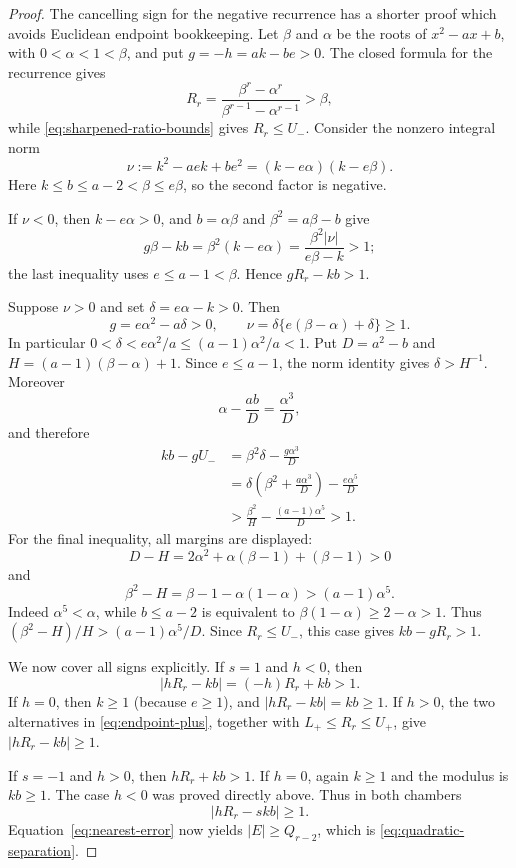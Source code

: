 \begin{proof}
The cancelling sign for the negative recurrence has a shorter proof which
avoids Euclidean endpoint bookkeeping.  Let $\beta$ and $\alpha$ be the
roots of $x^2-ax+b$, with $0<\alpha<1<\beta$, and put
$g=-h=ak-be>0$.  The closed formula for the recurrence gives
\[
R_r=\frac{\beta^r-\alpha^r}{\beta^{r-1}-\alpha^{r-1}}>\beta,
\]
while \eqref{eq:sharpened-ratio-bounds} gives $R_r\le U_-$.  Consider the
nonzero integral norm
\[
\nu:=k^2-aek+be^2=(k-e\alpha)(k-e\beta).
\]
Here $k\le b\le a-2<\beta\le e\beta$, so the second factor is negative.

If $\nu<0$, then $k-e\alpha>0$, and $b=\alpha\beta$ and
$\beta^2=a\beta-b$ give
\[
g\beta-kb=\beta^2(k-e\alpha)
=\frac{\beta^2|\nu|}{e\beta-k}>1;
\]
the last inequality uses $e\le a-1<\beta$.  Hence $gR_r-kb>1$.

Suppose $\nu>0$ and set $\delta=e\alpha-k>0$.  Then
\[
g=e\alpha^2-a\delta>0,
\qquad
\nu=\delta\{e(\beta-\alpha)+\delta\}\ge1.
\]
In particular
$0<\delta<e\alpha^2/a\le(a-1)\alpha^2/a<1$.  Put $D=a^2-b$ and
$H=(a-1)(\beta-\alpha)+1$.  Since $e\le a-1$, the norm identity gives
$\delta>H^{-1}$.  Moreover
\[
\alpha-\frac{ab}{D}=\frac{\alpha^3}{D},
\]
and therefore
\begin{align*}
kb-gU_-
&=\beta^2\delta-\frac{g\alpha^3}{D}\\
&=\delta\left(\beta^2+\frac{a\alpha^3}{D}\right)
  -\frac{e\alpha^5}{D}\\
&>\frac{\beta^2}{H}-\frac{(a-1)\alpha^5}{D}>1.
\end{align*}
For the final inequality, all margins are displayed:
\[
D-H=2\alpha^2+\alpha(\beta-1)+(\beta-1)>0
\]
and
\[
\beta^2-H=\beta-1-\alpha(1-\alpha)>(a-1)\alpha^5.
\]
Indeed $\alpha^5<\alpha$, while $b\le a-2$ is equivalent to
$\beta(1-\alpha)\ge2-\alpha>1$.  Thus
$(\beta^2-H)/H>(a-1)\alpha^5/D$.  Since $R_r\le U_-$, this case gives
$kb-gR_r>1$.

We now cover all signs explicitly.  If $s=1$ and $h<0$, then
\[
|hR_r-kb|=(-h)R_r+kb>1.
\]
If $h=0$, then $k\ge1$ (because $e\ge1$), and
$|hR_r-kb|=kb\ge1$.  If $h>0$, the two alternatives in
\eqref{eq:endpoint-plus}, together with
$L_+\le R_r\le U_+$, give $|hR_r-kb|\ge1$.

If $s=-1$ and $h>0$, then $hR_r+kb>1$.  If $h=0$, again $k\ge1$ and the
modulus is $kb\ge1$.  The case $h<0$ was proved directly above.
Thus in both chambers
\[
|hR_r-skb|\ge1.
\]
Equation~\eqref{eq:nearest-error} now yields $|E|\ge Q_{r-2}$, which is
\eqref{eq:quadratic-separation}.
\end{proof}

